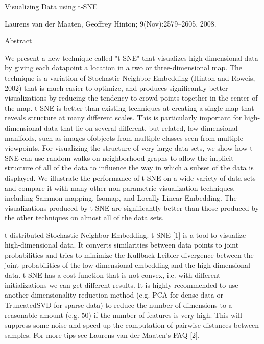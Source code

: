 Visualizing Data using t-SNE

Laurens van der Maaten, Geoffrey Hinton; 9(Nov):2579--2605, 2008.

Abstract

We present a new technique called "t-SNE" that visualizes high-dimensional data by giving each datapoint a location in a two or three-dimensional map. The technique is a variation of Stochastic Neighbor Embedding (Hinton and Roweis, 2002) that is much easier to optimize, and produces significantly better visualizations by reducing the tendency to crowd points together in the center of the map. t-SNE is better than existing techniques at creating a single map that reveals structure at many different scales. This is particularly important for high-dimensional data that lie on several different, but related, low-dimensional manifolds, such as images ofobjects from multiple classes seen from multiple viewpoints. For visualizing the structure of very large data sets, we show how t-SNE can use random walks on neighborhood graphs to allow the implicit structure of all of the data to influence the way in which a subset of the data is displayed. We illustrate the performance of t-SNE on a wide variety of data sets and compare it with many other non-parametric visualization techniques, including Sammon mapping, Isomap, and Locally Linear Embedding. The visualizations produced by t-SNE are significantly 
better than those produced by the other techniques on almost all of the data sets.


t-distributed Stochastic Neighbor Embedding.
t-SNE [1] is a tool to visualize high-dimensional data. It converts similarities between data points to joint probabilities and tries to minimize the Kullback-Leibler divergence between the joint probabilities of the low-dimensional embedding and the high-dimensional data. t-SNE has a cost function that is not convex, i.e. with different initializations we can get different results.
It is highly recommended to use another dimensionality reduction method (e.g. PCA for dense data or TruncatedSVD for sparse data) to reduce the number of dimensions to a reasonable amount (e.g. 50) if the number of features is very high. This will suppress some noise and speed up the computation of pairwise distances between samples. For more tips see Laurens van der Maaten’s FAQ [2].


